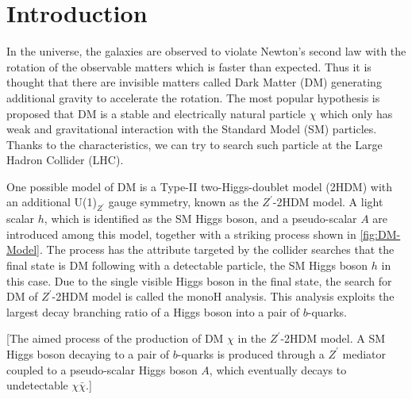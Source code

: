 \documentclass[class=NTHU_thesis, crop=false]{standalone}
\begin{document}
\chapter{Introduction}
\label{chap:Introduction}
In the universe, the galaxies are observed to violate Newton's second law with the rotation of the observable matters which is faster than expected. Thus it is thought that there are invisible matters called Dark Matter (DM) generating additional gravity to accelerate the rotation. The most popular hypothesis is proposed that DM is a stable and electrically natural particle $\chi$ which only has weak and gravitational interaction with the Standard Model (SM) particles. Thanks to the characteristics, we can try to search such particle at the Large Hadron Collider (LHC).

One possible model of DM is a Type-II two-Higgs-doublet model (2HDM) with an additional U(1)$_{Z^\prime}$ gauge symmetry, known as the $Z^\prime$-2HDM model. A light scalar $h$, which is identified as the SM Higgs boson, and a pseudo-scalar $A$ are introduced among this model, together with a striking process shown in \cref{fig:DM-Model}. The process has the attribute targeted by the collider searches that the final state is DM following with a detectable particle, the SM Higgs boson $h$ in this case. Due to the single visible Higgs boson in the final state, the search for DM of $Z^\prime$-2HDM model is called the monoH analysis. This analysis exploits the largest decay branching ratio of a Higgs boson into a pair of $b$-quarks.

[The aimed process of the production of DM $\chi$ in the $Z^\prime$-2HDM model. A SM Higgs boson decaying to a pair of $b$-quarks is produced through a $Z^\prime$ mediator coupled to a pseudo-scalar Higgs boson $A$, which eventually decays to undetectable $\chi\bar{\chi}$.]
\end{document}
